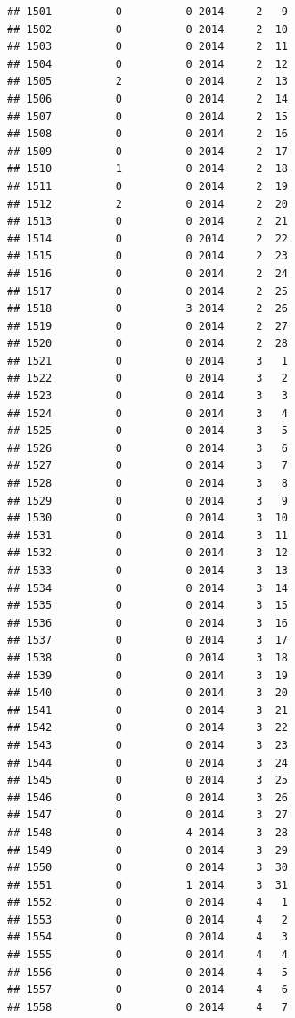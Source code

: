 \documentclass[
]{article}
\begin{document}
\begin{verbatim}
## 1501          0          0 2014     2   9
## 1502          0          0 2014     2  10
## 1503          0          0 2014     2  11
## 1504          0          0 2014     2  12
## 1505          2          0 2014     2  13
## 1506          0          0 2014     2  14
## 1507          0          0 2014     2  15
## 1508          0          0 2014     2  16
## 1509          0          0 2014     2  17
## 1510          1          0 2014     2  18
## 1511          0          0 2014     2  19
## 1512          2          0 2014     2  20
## 1513          0          0 2014     2  21
## 1514          0          0 2014     2  22
## 1515          0          0 2014     2  23
## 1516          0          0 2014     2  24
## 1517          0          0 2014     2  25
## 1518          0          3 2014     2  26
## 1519          0          0 2014     2  27
## 1520          0          0 2014     2  28
## 1521          0          0 2014     3   1
## 1522          0          0 2014     3   2
## 1523          0          0 2014     3   3
## 1524          0          0 2014     3   4
## 1525          0          0 2014     3   5
## 1526          0          0 2014     3   6
## 1527          0          0 2014     3   7
## 1528          0          0 2014     3   8
## 1529          0          0 2014     3   9
## 1530          0          0 2014     3  10
## 1531          0          0 2014     3  11
## 1532          0          0 2014     3  12
## 1533          0          0 2014     3  13
## 1534          0          0 2014     3  14
## 1535          0          0 2014     3  15
## 1536          0          0 2014     3  16
## 1537          0          0 2014     3  17
## 1538          0          0 2014     3  18
## 1539          0          0 2014     3  19
## 1540          0          0 2014     3  20
## 1541          0          0 2014     3  21
## 1542          0          0 2014     3  22
## 1543          0          0 2014     3  23
## 1544          0          0 2014     3  24
## 1545          0          0 2014     3  25
## 1546          0          0 2014     3  26
## 1547          0          0 2014     3  27
## 1548          0          4 2014     3  28
## 1549          0          0 2014     3  29
## 1550          0          0 2014     3  30
## 1551          0          1 2014     3  31
## 1552          0          0 2014     4   1
## 1553          0          0 2014     4   2
## 1554          0          0 2014     4   3
## 1555          0          0 2014     4   4
## 1556          0          0 2014     4   5
## 1557          0          0 2014     4   6
## 1558          0          0 2014     4   7

\end{verbatim}
\end{document}
